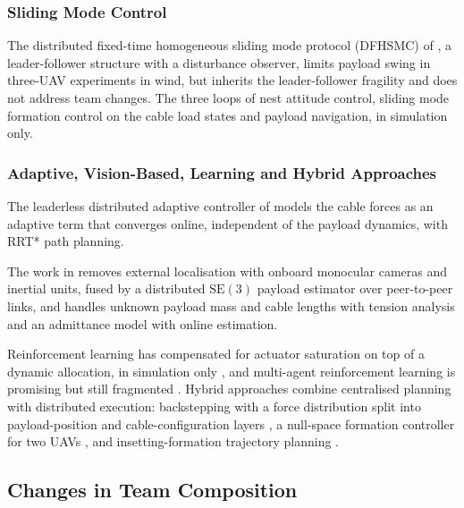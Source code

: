 \subsubsection{Sliding Mode Control}

The distributed fixed-time homogeneous sliding mode protocol (DFHSMC) of \cite{DFHSMC}, a leader-follower structure with a disturbance observer, limits payload swing in three-UAV experiments in wind, but inherits the leader-follower fragility and does not address team changes. The three loops of \cite{kotaruDynamicsControlQuadrotor2017} nest attitude control, sliding mode formation control on the cable load states and payload navigation, in simulation only.

\subsubsection{Adaptive, Vision-Based, Learning and Hybrid Approaches}

The leaderless distributed adaptive controller of \cite{arabPlanningDistributedControl2021} models the cable forces as an adaptive term that converges online, independent of the payload dynamics, with RRT* path planning.

The work in \cite{9376103} removes external localisation with onboard monocular cameras and inertial units, fused by a distributed $\text{SE}(3)$ payload estimator over peer-to-peer links, and \cite{10144367} handles unknown payload mass and cable lengths with tension analysis and an admittance model with online estimation.

Reinforcement learning has compensated for actuator saturation on top of a dynamic allocation, in simulation only \cite{liMultiUAVCooperativeTransportation2021}, and multi-agent reinforcement learning is promising but still fragmented \cite{ekechiSurveyUAVControl2025}. Hybrid approaches combine centralised planning with distributed execution: backstepping with a force distribution split into payload-position and cable-configuration layers \cite{wangRobustCooperativeTransportation2024}, a null-space formation controller for two UAVs \cite{gimenezMultiobjectiveControlCooperative2018}, and insetting-formation trajectory planning \cite{zhangIFBasedTrajectoryPlanning2023}.

\subsection{Changes in Team Composition}
\label{sec:lit_team}

